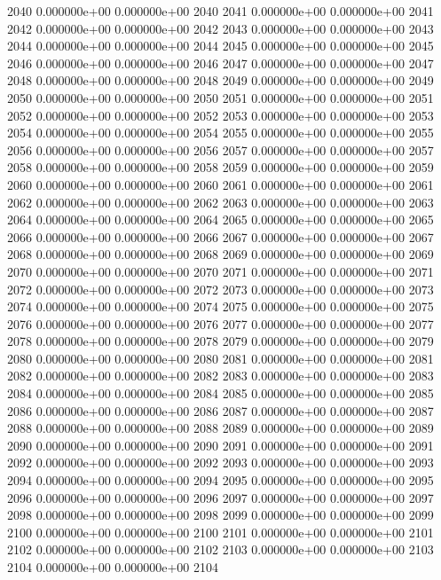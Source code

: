 \documentclass{article}
\begin{document}
\begin{Schunk}
\begin{Soutput}
2040   0.000000e+00   0.000000e+00 2040
2041   0.000000e+00   0.000000e+00 2041
2042   0.000000e+00   0.000000e+00 2042
2043   0.000000e+00   0.000000e+00 2043
2044   0.000000e+00   0.000000e+00 2044
2045   0.000000e+00   0.000000e+00 2045
2046   0.000000e+00   0.000000e+00 2046
2047   0.000000e+00   0.000000e+00 2047
2048   0.000000e+00   0.000000e+00 2048
2049   0.000000e+00   0.000000e+00 2049
2050   0.000000e+00   0.000000e+00 2050
2051   0.000000e+00   0.000000e+00 2051
2052   0.000000e+00   0.000000e+00 2052
2053   0.000000e+00   0.000000e+00 2053
2054   0.000000e+00   0.000000e+00 2054
2055   0.000000e+00   0.000000e+00 2055
2056   0.000000e+00   0.000000e+00 2056
2057   0.000000e+00   0.000000e+00 2057
2058   0.000000e+00   0.000000e+00 2058
2059   0.000000e+00   0.000000e+00 2059
2060   0.000000e+00   0.000000e+00 2060
2061   0.000000e+00   0.000000e+00 2061
2062   0.000000e+00   0.000000e+00 2062
2063   0.000000e+00   0.000000e+00 2063
2064   0.000000e+00   0.000000e+00 2064
2065   0.000000e+00   0.000000e+00 2065
2066   0.000000e+00   0.000000e+00 2066
2067   0.000000e+00   0.000000e+00 2067
2068   0.000000e+00   0.000000e+00 2068
2069   0.000000e+00   0.000000e+00 2069
2070   0.000000e+00   0.000000e+00 2070
2071   0.000000e+00   0.000000e+00 2071
2072   0.000000e+00   0.000000e+00 2072
2073   0.000000e+00   0.000000e+00 2073
2074   0.000000e+00   0.000000e+00 2074
2075   0.000000e+00   0.000000e+00 2075
2076   0.000000e+00   0.000000e+00 2076
2077   0.000000e+00   0.000000e+00 2077
2078   0.000000e+00   0.000000e+00 2078
2079   0.000000e+00   0.000000e+00 2079
2080   0.000000e+00   0.000000e+00 2080
2081   0.000000e+00   0.000000e+00 2081
2082   0.000000e+00   0.000000e+00 2082
2083   0.000000e+00   0.000000e+00 2083
2084   0.000000e+00   0.000000e+00 2084
2085   0.000000e+00   0.000000e+00 2085
2086   0.000000e+00   0.000000e+00 2086
2087   0.000000e+00   0.000000e+00 2087
2088   0.000000e+00   0.000000e+00 2088
2089   0.000000e+00   0.000000e+00 2089
2090   0.000000e+00   0.000000e+00 2090
2091   0.000000e+00   0.000000e+00 2091
2092   0.000000e+00   0.000000e+00 2092
2093   0.000000e+00   0.000000e+00 2093
2094   0.000000e+00   0.000000e+00 2094
2095   0.000000e+00   0.000000e+00 2095
2096   0.000000e+00   0.000000e+00 2096
2097   0.000000e+00   0.000000e+00 2097
2098   0.000000e+00   0.000000e+00 2098
2099   0.000000e+00   0.000000e+00 2099
2100   0.000000e+00   0.000000e+00 2100
2101   0.000000e+00   0.000000e+00 2101
2102   0.000000e+00   0.000000e+00 2102
2103   0.000000e+00   0.000000e+00 2103
2104   0.000000e+00   0.000000e+00 2104

\end{Soutput}
\end{Schunk}
\end{document}
